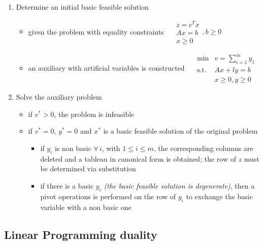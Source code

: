 \documentclass[english]{article}
\begin{document}
\begin{enumerate}[label=Phase \arabic*:, ref=phase \arabic*, leftmargin=*, labelindent=1em, widest*=8]
  \item Determine an initial basic feasible solution
        \begin{itemize}
          \item given the problem with equality constraints
                \(\quad \begin{matrix}
                  z = c^T x \\
                  Ax = b    \\
                  x \geq 0
                \end{matrix}, b \geq 0\)
          \item an auxiliary \LP with artificial variables is constructed
                \(\quad \begin{matrix}
                  \min        & v = \displaystyle \sum_{i=1}^m y_1 \\
                  \text{s.t.} & Ax + ly = b                        \\
                              & x \geq 0, y \geq 0
                \end{matrix}\)
        \end{itemize}
  \item Solve the auxiliary problem
        \begin{itemize}
          \item if \(v^\ast > 0\), the problem is infeasible
          \item if \(v^\ast = 0\), \(y^\ast = 0\) and \(x^\ast\) is a basic feasible solution of the original problem
                \begin{itemize}
                  \item if \(y_i\) is non basic \(\forall \, i\), with \(1 \leq i \leq m\), the corresponding columns are deleted and a tableau in canonical form is obtained; the row of \(z\) must be determined via substitution
                  \item if there is a basic \(y_i\) \textit{(the basic feasible solution is degenerate)}, then a pivot operations is performed on the row of \(y_i\) to exchange the basic variable with a non basic one
                \end{itemize}
        \end{itemize}
\end{enumerate}

\subsection{Linear Programming duality}
\end{document}
